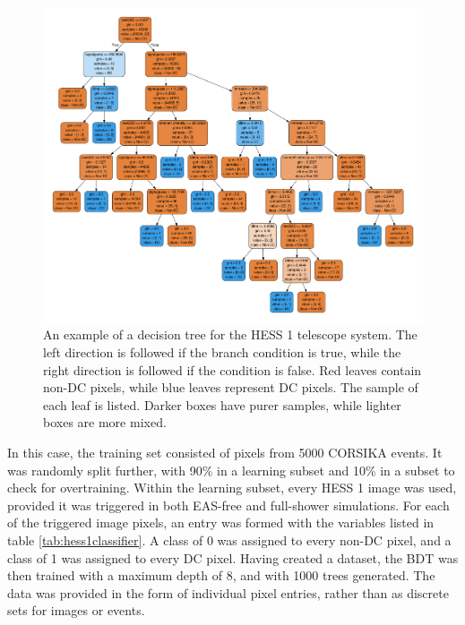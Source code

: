 \documentclass[11pt]{article}
\begin{document}
\begin{figure}
\begin{center}
\includegraphics[width=\textwidth]{decisiontreehess1}
\caption{An example of a decision tree for the HESS 1 telescope system. The left direction is followed if the branch condition is true, while the right direction is followed if the condition is false. Red leaves contain non-DC pixels, while blue leaves represent DC pixels. The sample of each leaf is listed. Darker boxes have purer samples, while lighter boxes are more mixed.}
\label{fig:decisiontree}
\end{center}
\end{figure}

In this case, the training set consisted of pixels from 5000 CORSIKA events. It was randomly split further, with 90\% in a learning subset and 10\% in a subset to check for overtraining. Within the learning subset, every HESS 1 image was used, provided it was triggered in both EAS-free and full-shower simulations. For each of the triggered image pixels, an entry was formed with the variables listed in table \ref{tab:hess1classifier}. A class of 0 was assigned to every non-DC pixel, and a class of 1 was assigned to every DC pixel. Having created a dataset, the BDT was then trained with a maximum depth of 8, and with 1000 trees generated. The data was provided in the form of individual pixel entries, rather than as discrete sets for images or events.
\end{document}
